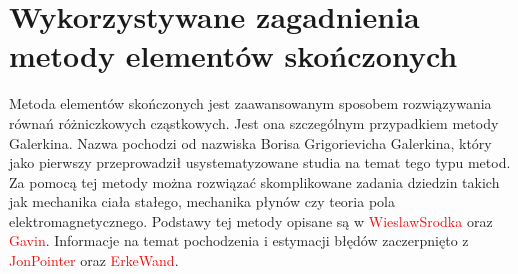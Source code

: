 
\chapter{Wykorzystywane zagadnienia metody elementów skończonych}
\label{cha:MES_chapter}
Metoda elementów skończonych jest zaawansowanym sposobem rozwiązywania równań różniczkowych cząstkowych. Jest ona szczególnym przypadkiem metody Galerkina. Nazwa pochodzi od nazwiska Borisa Grigorievicha Galerkina, który jako pierwszy przeprowadził usystematyzowane studia na temat tego typu metod. Za pomocą tej metody można rozwiązać skomplikowane zadania dziedzin takich jak mechanika ciała stałego, mechanika płynów czy teoria pola elektromagnetycznego. Podstawy tej metody opisane są w \textcolor{red}{WieslawSrodka} oraz \textcolor{red}{Gavin}. Informacje na temat pochodzenia i estymacji błędów zaczerpnięto z \textcolor{red}{JonPointer} oraz \textcolor{red}{ErkeWand}.





































